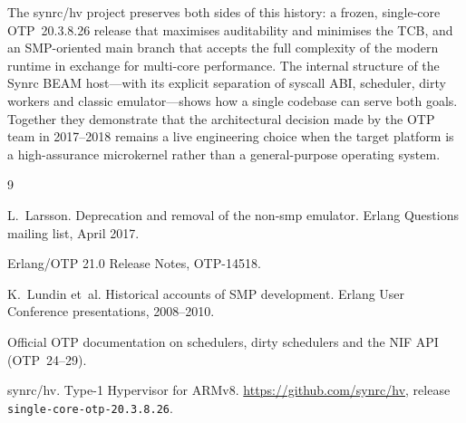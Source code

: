 \documentclass{article}
\begin{document}
The synrc/hv project preserves both sides of this history:
a frozen, single-core OTP~20.3.8.26 release that maximises auditability and minimises the TCB, and an SMP-oriented main branch that accepts the full complexity of the modern runtime in exchange for multi-core performance.
The internal structure of the Synrc BEAM host---with its explicit separation of syscall ABI, scheduler, dirty workers and classic emulator---shows how a single codebase can serve both goals.
Together they demonstrate that the architectural decision made by the OTP team in 2017--2018 remains a live engineering choice when the target platform is a high-assurance microkernel rather than a general-purpose operating system.

\begin{thebibliography}{9}

L.~Larsson.
\newblock Deprecation and removal of the non-smp emulator.
\newblock Erlang Questions mailing list, April 2017.

Erlang/OTP 21.0 Release Notes, OTP-14518.

K.~Lundin et~al.
\newblock Historical accounts of SMP development.
\newblock Erlang User Conference presentations, 2008--2010.

Official OTP documentation on schedulers, dirty schedulers and the NIF API (OTP~24--29).

synrc/hv.
\newblock Type-1 Hypervisor for ARMv8.
\newblock \url{https://github.com/synrc/hv}, release \texttt{single-core-otp-20.3.8.26}.

\end{thebibliography}
\end{document}
